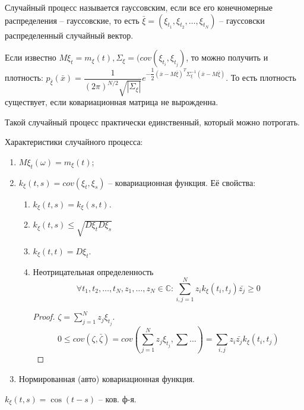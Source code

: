 \begin{definition}
  Случайный процесс называется гауссовским, если все его конечномерные распределения
  -- гауссовские, то есть $\bar\xi = (\xi_{t_1}, \xi_{t_2}, \dots, \xi_{t_N})$ --
  гауссовски распределенный случайный вектор.

  Если известно $M\xi_t = m_\xi (t), \Sigma_\xi = (cov(\xi_{t_i}, \xi_{t_j})$,
  то можно получить и плотность:
  $p_{\bar{\xi}} (\bar{x}) = \dfrac{1}{(2\pi)^{N/2} \sqrt{|\Sigma_\xi|}} e^{ -\dfrac{1}{2} (\bar{x} - M\bar{\xi})^T \Sigma^{-1}_\xi (\bar{x} - M\bar{\xi}) }.$ То есть плотность 
  существует, если ковариационная матрица не вырожденна.

  Такой случайный процесс практически единственный, который можно потрогать.
\end{definition}

Характеристики случайного процесса:
\begin{enumerate}
  \item $M\xi_t(\omega) = m_\xi(t)$;
  \item $k_\xi (t, s) = cov(\xi_t, \xi_s)$ -- ковариационная функция.
    Её свойства:
    \begin{enumerate}
      \item $k_\xi (t, s) = k_\xi (s, t)$.
      \item $k_\xi (t, s) \leqslant \sqrt{D\xi_t D\xi_s}$
      \item $k_\xi(t, t) = D\xi_t$.
      \item Неотрицательная определенность
        \[
          \forall t_1, t_2, \dots, t_N, z_1, \dots, z_N \in \mathbb{C} : \sum_{i, j = 1}^N z_i k_\xi(t_i, t_j) \bar{z_j} \geqslant 0
        \]
        \begin{proof}
          $\zeta = \sum_{j=1}^N z_j \xi_{t_j}$.
          \[
            0 \leqslant cov(\zeta, \bar{\zeta}) = cov(\sum_{j=1}^N z_j \xi_{t_j}, \sum \dots) = \sum_{i, j} z_i \bar{z_j} k_\xi(t_i, t_j)
          \]
        \end{proof}
    \end{enumerate}
  \item Нормированная (авто) ковариационная функция.
\end{enumerate}

\begin{ex}
  $k_\xi(t, s) = \cos(t-s)$ -- ков. ф-я.
\end{ex}


